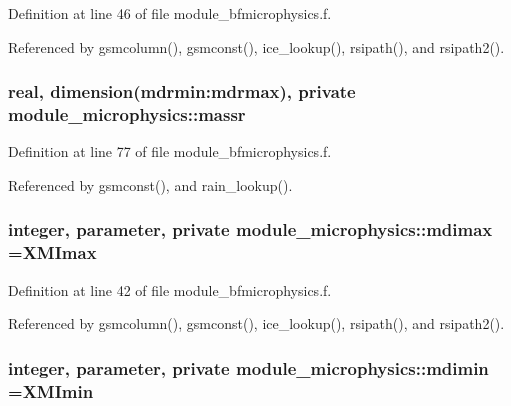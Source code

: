 Definition at line 46 of file module\+\_\+bfmicrophysics.\+f.



Referenced by gsmcolumn(), gsmconst(), ice\+\_\+lookup(), rsipath(), and rsipath2().

\subsubsection[{\texorpdfstring{massr}{massr}}]{\setlength{\rightskip}{0pt plus 5cm}real, dimension(mdrmin\+:mdrmax), private module\+\_\+microphysics\+::massr\hspace{0.3cm}{\ttfamily [private]}}\hypertarget{namespacemodule__microphysics_a3b33f42c343ef0fbfe6585bbeccc99c7}{}\label{namespacemodule__microphysics_a3b33f42c343ef0fbfe6585bbeccc99c7}


Definition at line 77 of file module\+\_\+bfmicrophysics.\+f.



Referenced by gsmconst(), and rain\+\_\+lookup().

\subsubsection[{\texorpdfstring{mdimax}{mdimax}}]{\setlength{\rightskip}{0pt plus 5cm}integer, parameter, private module\+\_\+microphysics\+::mdimax =X\+M\+Imax\hspace{0.3cm}{\ttfamily [private]}}\hypertarget{namespacemodule__microphysics_a28b728213c1425c1bd5c05c9a469b92a}{}\label{namespacemodule__microphysics_a28b728213c1425c1bd5c05c9a469b92a}


Definition at line 42 of file module\+\_\+bfmicrophysics.\+f.



Referenced by gsmcolumn(), gsmconst(), ice\+\_\+lookup(), rsipath(), and rsipath2().

\subsubsection[{\texorpdfstring{mdimin}{mdimin}}]{\setlength{\rightskip}{0pt plus 5cm}integer, parameter, private module\+\_\+microphysics\+::mdimin =X\+M\+Imin\hspace{0.3cm}{\ttfamily [private]}}\hypertarget{namespacemodule__microphysics_a81bcf203ed1a75b10ea2c7f97ac56a21}{}\label{namespacemodule__microphysics_a81bcf203ed1a75b10ea2c7f97ac56a21}


